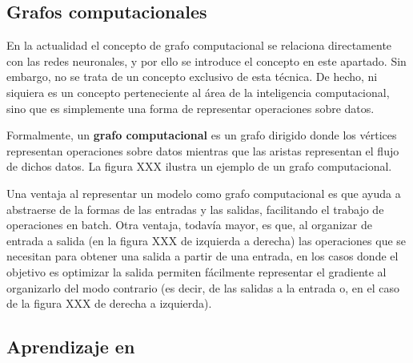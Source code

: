 
\subsection{Grafos computacionales}

En la actualidad el concepto de grafo computacional se relaciona directamente con las redes neuronales, y por ello se introduce el concepto en este apartado. Sin embargo, no se trata de un concepto exclusivo de esta técnica. De hecho, ni siquiera es un concepto perteneciente al área de la inteligencia computacional, sino que es simplemente una forma de representar operaciones sobre datos.

Formalmente, un \textbf{grafo computacional} es un grafo dirigido donde los vértices representan operaciones sobre datos mientras que las aristas representan el flujo de dichos datos. La figura XXX ilustra un ejemplo de un grafo computacional.

Una ventaja al representar un modelo como grafo computacional es que ayuda a abstraerse de la formas de las entradas y las salidas, facilitando el trabajo de operaciones en batch. Otra ventaja, todavía mayor, es que, al organizar de entrada a salida (en la figura XXX de izquierda a derecha) las operaciones que se necesitan para obtener una salida a partir de una entrada, en los casos donde el objetivo es optimizar la salida permiten fácilmente representar el gradiente al organizarlo del modo contrario (es decir, de las salidas a la entrada o, en el caso de la figura XXX de derecha a izquierda).


\subsection{Aprendizaje en }


